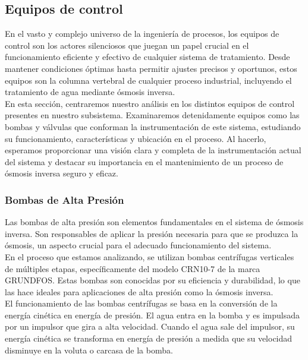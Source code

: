 \subsection{Equipos de control}

En el vasto y complejo universo de la ingeniería de procesos, los equipos de 
control son los actores silenciosos que juegan un papel crucial en el funcionamiento eficiente y 
efectivo de cualquier sistema de tratamiento. Desde mantener condiciones óptimas hasta permitir ajustes precisos y 
oportunos, estos equipos son la columna vertebral de cualquier proceso industrial, incluyendo el tratamiento de agua 
mediante ósmosis inversa.\\

En esta sección, centraremos nuestro análisis en los distintos equipos de control presentes en nuestro subsistema.
 Examinaremos detenidamente equipos como las bombas y válvulas que conforman 
la instrumentación de este sistema, estudiando su funcionamiento, características y 
ubicación en el proceso. Al hacerlo, esperamos proporcionar una visión clara y completa de la instrumentación 
actual del sistema y destacar su importancia en el mantenimiento de un proceso de ósmosis inversa seguro y eficaz.\\

\subsubsection{Bombas de Alta Presión}

Las bombas de alta presión son elementos fundamentales en el sistema de ósmosis inversa. Son responsables de aplicar la presión necesaria para que se produzca la ósmosis, un aspecto crucial para el adecuado funcionamiento del sistema.\\

En el proceso que estamos analizando, se utilizan bombas centrífugas verticales de múltiples etapas, específicamente del modelo CRN10-7 de la marca GRUNDFOS. Estas bombas son conocidas por su eficiencia y durabilidad, lo que las hace ideales para aplicaciones de alta presión como la ósmosis inversa.\\

El funcionamiento de las bombas centrífugas se basa en la conversión de la energía cinética en energía de presión. El agua entra en la bomba y es impulsada por un impulsor que gira a alta velocidad. Cuando el agua sale del impulsor, su energía cinética se transforma en energía de presión a medida que su velocidad disminuye en la voluta o carcasa de la bomba.\\

